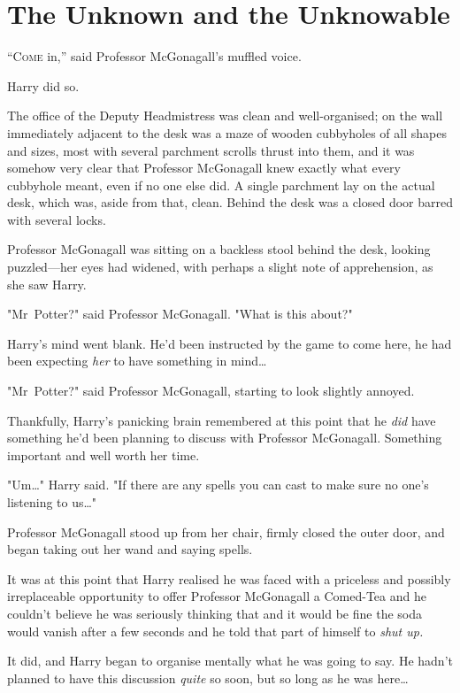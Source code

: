 \chapter{The Unknown and the Unknowable}

\lettrine{“C}{ome} in,'' said Professor McGonagall's muffled voice.

\quad\quad
Harry did so.

The office of the Deputy Headmistress was clean and well-organised; on the wall
immediately adjacent to the desk was a maze of wooden cubbyholes of all shapes
and sizes, most with several parchment scrolls thrust into them, and it was
somehow very clear that Professor McGonagall knew exactly what every cubbyhole
meant, even if no one else did. A single parchment lay on the actual desk,
which was, aside from that, clean. Behind the desk was a closed door barred
with several locks.

Professor McGonagall was sitting on a backless stool behind the desk, looking
puzzled---her eyes had widened, with perhaps a slight note of apprehension, as
she saw Harry.

"Mr~Potter?" said Professor McGonagall. "What is this about?"

Harry's mind went blank. He'd been instructed by the game to come here, he had
been expecting \emph{her} to have something in mind…

"Mr~Potter?" said Professor McGonagall, starting to look slightly annoyed.

Thankfully, Harry's panicking brain remembered at this point that he \emph{did}
have something he'd been planning to discuss with Professor McGonagall.
Something important and well worth her time.

"Um…" Harry said. "If there are any spells you can cast to make sure no
one's listening to us…"

Professor McGonagall stood up from her chair, firmly closed the outer door, and
began taking out her wand and saying spells.

It was at this point that Harry realised he was faced with a priceless and
possibly irreplaceable opportunity to offer Professor McGonagall a Comed-Tea
and he couldn't believe he was seriously thinking that and it would be fine the
soda would vanish after a few seconds and he told that part of himself to
\emph{shut up.}

It did, and Harry began to organise mentally what he was going to say. He
hadn't planned to have this discussion \emph{quite} so soon, but so long as he
was here…

